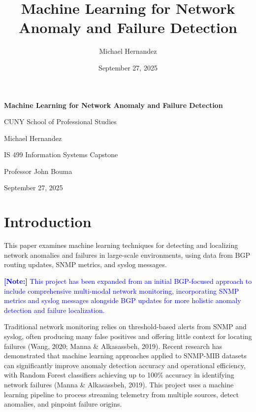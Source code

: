 \documentclass[11pt]{article}
\title{Machine Learning for Network Anomaly and Failure Detection}
\author{Michael Hernandez}
\date{September 27, 2025}
\begin{document}
\begin{titlepage}
\centering
\vspace*{2cm}

{\Large \textbf{Machine Learning for Network Anomaly and Failure Detection}}

\vspace{1.5cm}

{\large CUNY School of Professional Studies}

\vspace{0.5cm}

{\large Michael Hernandez}

\vspace{0.5cm}

{\large IS 499 Information Systems Capstone}

\vspace{0.5cm}

{\large Professor John Bouma}

\vspace{0.5cm}

{\large September 27, 2025}

\vfill

\end{titlepage}

\tableofcontents
\newpage

\section{Introduction}

This paper examines machine learning techniques for detecting and localizing network anomalies and failures in large-scale environments, using data from BGP routing updates, SNMP metrics, and syslog messages.

\textcolor{blue}{\textbf{[Note:]} This project has been expanded from an initial BGP-focused approach to include comprehensive multi-modal network monitoring, incorporating SNMP metrics and syslog messages alongside BGP updates for more holistic anomaly detection and failure localization.}

Traditional network monitoring relies on threshold-based alerts from SNMP and syslog, often producing many false positives and offering little context for locating failures (Wang, 2020; Manna \& Alkasassbeh, 2019). Recent research has demonstrated that machine learning approaches applied to SNMP-MIB datasets can significantly improve anomaly detection accuracy and operational efficiency, with Random Forest classifiers achieving up to 100\% accuracy in identifying network failures (Manna \& Alkasassbeh, 2019). This project uses a machine learning pipeline to process streaming telemetry from multiple sources, detect anomalies, and pinpoint failure origins.
\end{document}
